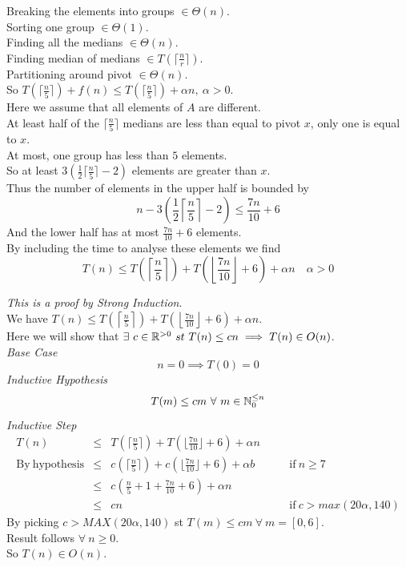 \documentclass[11pt,a4paper]{article}
\begin{document}
Breaking the elements into groups $\in\Theta(n)$.\\
Sorting one group $\in\Theta(1)$.\\
Finding all the medians $\in\Theta(n)$.\\
Finding median of medians $\in T(\lceil\frac{n}{r}\rceil)$.\\
Partitioning around pivot $\in\Theta(n)$.\\
So $T(\lceil\frac{n}{5}\rceil) + f(n) \leq T(\lceil\frac{n}{5}\rceil) + \alpha n,\ \alpha>0$.\\

Here we assume that all elements of $A$ are different.\\
At least half of the $\lceil\frac{n}{5}\rceil$ medians are less than equal to pivot $x$, only one is equal to $x$.\\
At most, one group has less than $5$ elements.\\
So at least $3(\frac{1}{2}\lceil\frac{n}{5}\rceil-2)$ elements are greater than $x$.\\
Thus the number of elements in the upper half is bounded by
$$n-3\left(\frac{1}{2}\left\lceil\frac{n}{5}\right\rceil-2\right)\leq \frac{7n}{10}+6$$
And the lower half has at most $\frac{7n}{10}+6$ elements.\\
By including the time to analyse these elements we find
$$T(n)\leq T\left(\left\lceil\frac{n}{5}\right\rceil\right)+T\left(\left\lfloor\frac{7n}{10}\right\rfloor+6\right)+\alpha n\quad\alpha>0$$

\newpage
{}
\textit{This is a proof by Strong Induction}.\\
We have $T(n)\leq T\left(\left\lceil\frac{n}{5}\right\rceil\right)+T\left(\left\lfloor\frac{7n}{10}\right\rfloor+6\right)+\alpha n$.\\
Here we will show that $\exists\ c\in\real^{>0}\ st\ T(n)\leq cn \implies T(n)\in O(n)$.\\
\textit{Base Case}
$$n=0 \implies T(0)=0$$
\textit{Inductive Hypothesis}
$$T(m)\leq cm\ \forall\ m\in\nats_{0}^{\leq n}$$
\textit{Inductive Step}
\[\begin{array}{rclcl}
T(n) &\leq& T(\lceil\frac{n}{5}\rceil)+T(\lfloor\frac{7n}{10}\rfloor+6)+\alpha n\\
\mathrm{By\ hypothesis}&\leq& c(\lceil\frac{n}{5}\rceil)+c(\lfloor\frac{7n}{10}\rfloor+6)+\alpha b&\quad&\mathrm{if\ }n\geq 7\\
&\leq&c(\frac{n}{5}+1+\frac{7n}{10}+6)+\alpha n\\
&\leq&cn&&\mathrm{if\ }c>max(20\alpha, 140)
\end{array}\]
By picking $c>MAX(20\alpha, 140)$ st $T(m)\leq cm\ \forall\ m=[0,6]$.\\
Result follows $\forall\ n\geq 0$.\\
So $T(n) \in O(n)$.\\
\end{document}
